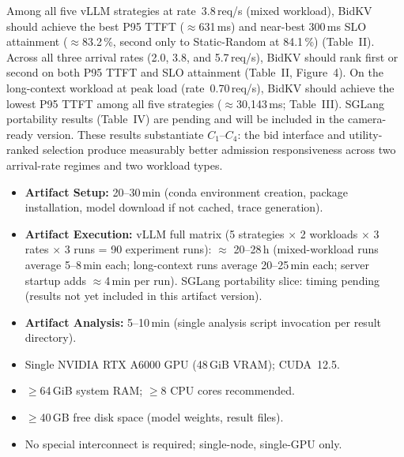 \documentclass[conference]{IEEEtran}
\begin{document}
\artexp

Among all five vLLM strategies at rate~3.8\,req/s (mixed workload), BidKV
should achieve the best P95 TTFT ($\approx$631\,ms) and near-best 300\,ms
SLO attainment ($\approx$83.2\,\%, second only to Static-Random at 84.1\,\%)
(Table~II).
Across all three arrival rates (2.0, 3.8, and 5.7\,req/s), BidKV should
rank first or second on both P95 TTFT and SLO attainment (Table~II, Figure~4).
On the long-context workload at peak load (rate~0.70\,req/s), BidKV should
achieve the lowest P95 TTFT among all five strategies
($\approx$30{,}143\,ms; Table~III).
SGLang portability results (Table~IV) are pending and will be included in the
camera-ready version.
These results substantiate $C_1$--$C_4$: the bid interface and
utility-ranked selection produce measurably better admission responsiveness
across two arrival-rate regimes and two workload types.

\arttime

\begin{itemize}
  \item \textbf{Artifact Setup:} 20--30\,min
    (conda environment creation, package installation, model download if not
    cached, trace generation).
  \item \textbf{Artifact Execution:}
    vLLM full matrix (5 strategies $\times$ 2 workloads $\times$ 3 rates
    $\times$ 3 runs = 90 experiment runs): $\approx$ 20--28\,h
    (mixed-workload runs average 5--8\,min each; long-context runs average
    20--25\,min each; server startup adds $\approx$4\,min per run).
    SGLang portability slice: timing pending (results not yet included in
    this artifact version).
  \item \textbf{Artifact Analysis:} 5--10\,min
    (single analysis script invocation per result directory).
\end{itemize}

\artin


\begin{itemize}
  \item Single NVIDIA RTX A6000 GPU (48\,GiB VRAM); CUDA~12.5.
  \item $\geq$64\,GiB system RAM; $\geq$8 CPU cores recommended.
  \item $\geq$40\,GB free disk space (model weights, result files).
  \item No special interconnect is required; single-node, single-GPU only.
\end{itemize}
\end{document}
